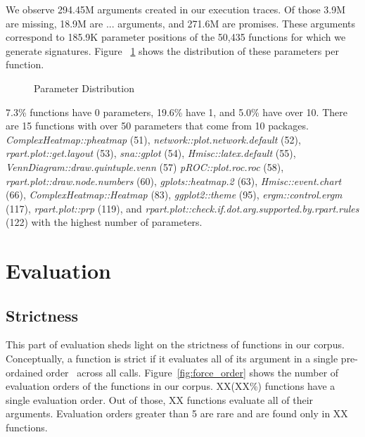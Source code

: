 \documentclass[screen,acmsmall]{acmart}
\begin{document}
We observe 294.45M arguments created in our execution traces. Of those 3.9M are
missing, 18.9M are $...$ arguments, and 271.6M are promises. These arguments
correspond to 185.9K parameter positions of the 50,435 functions for which we
generate signatures. Figure ~\ref{fig:paramDist} shows the distribution of these
parameters per function.

\begin{figure}[!h]
  \centering
  
  \caption{Parameter Distribution}
  \label{fig:paramDist}
\end{figure}

7.3\% functions have 0 parameters, 19.6\% have 1, and
5.0\% have over 10. There are 15 functions with over 50 parameters that come
from 10 packages. \emph{ComplexHeatmap::pheatmap} (51),
\emph{network::plot.network.default} (52), \emph{rpart.plot::get.layout} (53),
\emph{sna::gplot} (54), \emph{Hmisc::latex.default} (55),
\emph{VennDiagram::draw.quintuple.venn} (57) \emph{pROC::plot.roc.roc} (58),
\emph{rpart.plot::draw.node.numbers} (60), \emph{gplots::heatmap.2} (63),
\emph{Hmisc::event.chart} (66), \emph{ComplexHeatmap::Heatmap} (83),
\emph{ggplot2::theme} (95), \emph{ergm::control.ergm} (117),
\emph{rpart.plot::prp} (119), and
\emph{rpart.plot::check.if.dot.arg.supported.by.rpart.rules} (122) with the
highest number of parameters.

\section{Evaluation}
% 

\subsection{Strictness}

This part of evaluation sheds light on the strictness of functions in our
corpus. Conceptually, a function is strict if it evaluates all of its argument
in a single pre-ordained order~\cite{oopsla19b} across all calls.
Figure~\ref{fig:force_order} shows the number of evaluation orders of the
functions in our corpus. XX(XX\%) functions have a single evaluation order. Out
of those, XX functions evaluate all of their arguments. Evaluation orders
greater than 5 are rare and are found only in XX functions.
\end{document}
